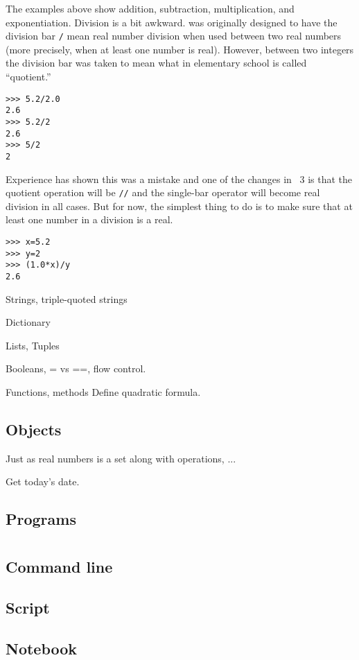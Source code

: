 The examples above show addition, subtraction, multiplication, 
and exponentiation. 
Division is a bit awkward.
\python{} was originally designed to have the division bar
\lstinline[style=inline]!/! mean real number division when used between
two real numbers (more precisely, when at least one number is real).
However, between two integers the division bar was taken to mean 
what in elementary school is called ``quotient.''
\begin{lstlisting}[style=python]
>>> 5.2/2.0
2.6
>>> 5.2/2
2.6
>>> 5/2
2
\end{lstlisting}
Experience has shown this was a mistake and one of the changes in \python~3
is that the quotient operation will be \lstinline[style=inline]!//!
and the single-bar operator will become real division in all cases.
But for now, the simplest thing to do is to make sure that at least one
number in a division is a real.
\begin{lstlisting}[style=python]
>>> x=5.2
>>> y=2
>>> (1.0*x)/y
2.6
\end{lstlisting}
 


Strings, triple-quoted strings


Dictionary


Lists, Tuples

Booleans, = vs ==,
flow control.

Functions, methods
Define quadratic formula.





\subsection{Objects}

Just as real numbers is a set along with operations, ...

Get today's date.


\subsection{Programs}



\section{\sage}

\subsection{Command line}

\subsection{Script}

\subsection{Notebook}

\endinput